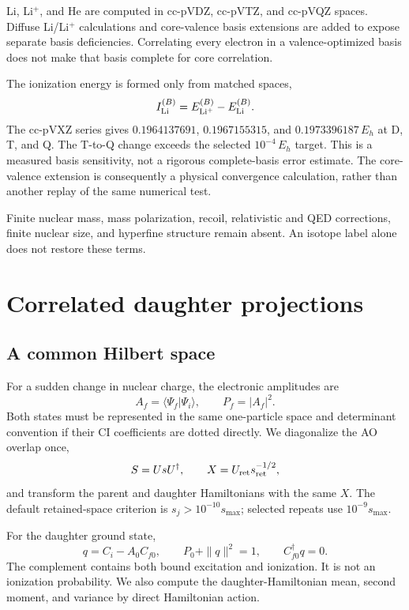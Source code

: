 \documentclass[
  10pt,
]{article}
\begin{document}
Li, Li\(^{+}\), and He are computed in cc-pVDZ, cc-pVTZ, and cc-pVQZ
spaces. Diffuse Li/Li\(^{+}\) calculations and core-valence basis
extensions are added to expose separate basis deficiencies. Correlating
every electron in a valence-optimized basis does not make that basis
complete for core correlation.

The ionization energy is formed only from matched spaces, \[
I_{\rm Li}^{(B)}=E_{\rm Li^+}^{(B)}-E_{\rm Li}^{(B)}.
\] The cc-pVXZ series gives \(0.1964137691\), \(0.1967155315\), and
\(0.1973396187\,E_h\) at D, T, and Q. The T-to-Q change exceeds the
selected \(10^{-4}\,E_h\) target. This is a measured basis sensitivity,
not a rigorous complete-basis error estimate. The core-valence extension
is consequently a physical convergence calculation, rather than another
replay of the same numerical test.

Finite nuclear mass, mass polarization, recoil, relativistic and QED
corrections, finite nuclear size, and hyperfine structure remain absent.
An isotope label alone does not restore these terms.

\hypertarget{correlated-daughter-projections}{%
\section{Correlated daughter
projections}\label{correlated-daughter-projections}}

\hypertarget{a-common-hilbert-space}{%
\subsection{A common Hilbert space}\label{a-common-hilbert-space}}

For a sudden change in nuclear charge, the electronic amplitudes are \[
A_f=\langle\Psi_f|\Psi_i\rangle,\qquad P_f=|A_f|^2.
\] Both states must be represented in the same one-particle space and
determinant convention if their CI coefficients are dotted directly. We
diagonalize the AO overlap once, \[
S=UsU^\dagger,\qquad X=U_{\rm ret}s_{\rm ret}^{-1/2},
\] and transform the parent and daughter Hamiltonians with the same
\(X\). The default retained-space criterion is \(s_j>10^{-10}s_{\max}\);
selected repeats use \(10^{-9}s_{\max}\).

For the daughter ground state, \[
q=C_i-A_0C_{f0},\qquad
P_0+\|q\|^2=1,\qquad C_{f0}^\dagger q=0.
\] The complement contains both bound excitation and ionization. It is
not an ionization probability. We also compute the daughter-Hamiltonian
mean, second moment, and variance by direct Hamiltonian action.
\end{document}

